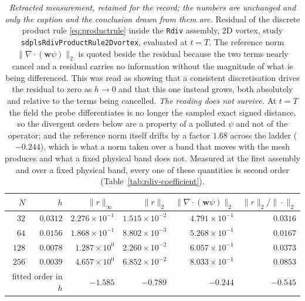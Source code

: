 \documentclass[preprint,3p,11pt]{elsarticle}
\newcommand{\psilev}{\psi}
\begin{document}
\begin{table}[htbp]
  \centering
  \caption{\emph{Retracted measurement, retained for the record; the numbers are
  unchanged and only the caption and the conclusion drawn from them are.} Residual
  of the discrete product rule \eqref{eq:productrule} inside the \texttt{Rdiv}
  assembly, 2D vortex, study \texttt{sdplsRdivProductRule2Dvortex}, evaluated at
  $t=T$. The reference norm $\|\nabla\cdot(\mathbf{w}\psilev)\|_2$ is quoted beside
  the residual because the two terms nearly cancel and a residual carries no
  information without the magnitude of what is being differenced. This was read as
  showing that a consistent discretisation drives the residual to zero as
  $h\to0$ and that this one instead grows, both absolutely and relative to the
  terms being cancelled. \emph{The reading does not survive.} At $t=T$ the field
  the probe differentiates is no longer the sampled exact signed distance, so the
  divergent orders below are a property of a polluted $\psilev$ and not of the
  operator; and the reference norm itself drifts by a factor $1.68$ across the
  ladder ($-0.244$), which is what a norm taken over a band that moves with the mesh
  produces and what a fixed physical band does not. Measured at the first assembly
  and over a fixed physical band, every one of these quantities is second order
  (Table~\ref{tab:rdiv-coefficient}).}
  \label{tab:rdiv-productrule}
  \begin{tabular}{rrrrrr}
    \hline
    $N$ & $h$ & $\|r\|_\infty$ & $\|r\|_2$ & $\|\nabla\cdot(\mathbf{w}\psilev)\|_2$
        & $\|r\|_2/\|\cdot\|_2$ \\
    \hline
    $32$  & $0.0312$ & $2.276\times10^{-1}$ & $1.515\times10^{-2}$ & $4.791\times10^{-1}$ & $0.0316$ \\
    $64$  & $0.0156$ & $1.868\times10^{-1}$ & $8.802\times10^{-3}$ & $5.268\times10^{-1}$ & $0.0167$ \\
    $128$ & $0.0078$ & $1.287\times10^{0}$  & $2.260\times10^{-2}$ & $6.057\times10^{-1}$ & $0.0373$ \\
    $256$ & $0.0039$ & $4.657\times10^{0}$  & $6.852\times10^{-2}$ & $8.033\times10^{-1}$ & $0.0853$ \\
    \hline
    \multicolumn{2}{r}{fitted order in $h$} & $-1.585$ & $-0.789$ & $-0.244$ & $-0.545$ \\
    \hline
  \end{tabular}
\end{table}
\end{document}
